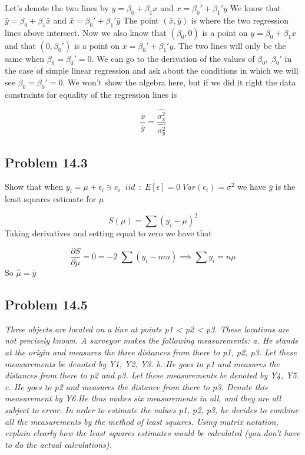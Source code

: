\documentclass[12pt,]{article}
\begin{document}
Let's denote the two lines by \(y = \beta_0 + \beta_1 x\) and
\(x = \beta_0' + \beta_1' y\) We know that
\(\bar{y} = \beta_0 + \beta_1 \bar{x}\) and
\(\bar{x} = \beta_0' + \beta_1' \bar{y}\) The point
\((\bar{x},\bar{y})\) is where the two regression lines above intersect.
Now we also know that \((\beta_0,0)\) is a point on
\(y = \beta_0 + \beta_1 x\) and that \((0,\beta_0')\) is a point on
\(x = \beta_0' + \beta_1' y\). The two lines will only be the same when
\(\beta_0=\beta_0'=0\). We can go to the derivation of the values of
\(\beta_0 ,\; \beta_0'\) in the case of simple linear regression and ask
about the conditions in which we will see \(\beta_0=\beta_0'=0\). We
won't show the algebra here, but if we did it right the data constraints
for equality of the regression lines is

\[ \frac{\bar{x}}{\bar{y}} = \frac{\hat{\sigma_x^2}}{\hat{\sigma_y^2}}\]

\subsection{Problem 14.3}\label{problem-14.3}

Show that when
\(y_i = \mu + \epsilon_i \ni e_i \;\;iid \,\; : \; E[\epsilon]=0 \; Var(\epsilon_i)=\sigma^2\)
we have \(\bar{y}\) is the least squares estimate for \(\mu\)

\[ S(\mu) = \sum (y_i - \mu)^2 \] Taking derivatives and setting equal
to zero we have that

\[\frac{\partial S}{\partial \mu} = 0 = -2 \; \sum (y_i - mu) \implies \sum y_i = n \mu \]
So \(\hat{\mu} = \bar{y}\)

\subsection{Problem 14.5}\label{problem-14.5}

\emph{Three objects are located on a line at points p1 \textless{} p2
\textless{} p3. These locations are not precisely known. A surveyor
makes the following measurements: a. He stands at the origin and
measures the three distances from there to p1, p2, p3. Let these
measurements be denoted by Y1, Y2, Y3. b. He goes to p1 and measures the
distances from there to p2 and p3. Let these measurements be denoted by
Y4, Y5. c. He goes to p2 and measures the distance from there to p3.
Denote this measurement by Y6.He thus makes six measurements in all, and
they are all subject to error. In order to estimate the values p1, p2,
p3, he decides to combine all the measurements by the method of least
squares. Using matrix notation, explain clearly how the least squares
estimates would be calculated (you don't have to do the actual
calculations).}
\end{document}
